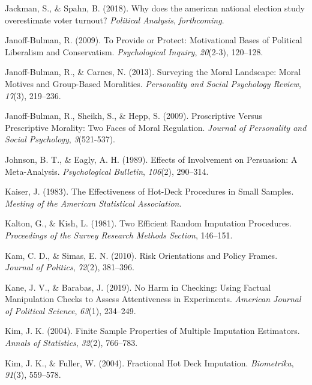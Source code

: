 \documentclass[12pt,econ]{sources/authesis}
\begin{document}
\leavevmode\hypertarget{ref-jackman_2018_does}{}%
Jackman, S., \& Spahn, B. (2018). Why does the american national election study overestimate voter turnout? \emph{Political Analysis}, \emph{forthcoming}.

\leavevmode\hypertarget{ref-janoff-bulman_2009_provide}{}%
Janoff-Bulman, R. (2009). To Provide or Protect: Motivational Bases of Political Liberalism and Conservatism. \emph{Psychological Inquiry}, \emph{20}(2-3), 120--128.

\leavevmode\hypertarget{ref-janoff-bulman_2013_surveying}{}%
Janoff-Bulman, R., \& Carnes, N. (2013). Surveying the Moral Landscape: Moral Motives and Group-Based Moralities. \emph{Personality and Social Psychology Review}, \emph{17}(3), 219--236.

\leavevmode\hypertarget{ref-janoff-bulman_2009_proscriptive}{}%
Janoff-Bulman, R., Sheikh, S., \& Hepp, S. (2009). Proscriptive Versus Prescriptive Morality: Two Faces of Moral Regulation. \emph{Journal of Personality and Social Psychology}, \emph{3}(521-537).

\leavevmode\hypertarget{ref-johnson_1989_effects}{}%
Johnson, B. T., \& Eagly, A. H. (1989). Effects of Involvement on Persuasion: A Meta-Analysis. \emph{Psychological Bulletin}, \emph{106}(2), 290--314.

\leavevmode\hypertarget{ref-kaiser_1983_effectiveness}{}%
Kaiser, J. (1983). The Effectiveness of Hot-Deck Procedures in Small Samples. \emph{Meeting of the American Statistical Association}.

\leavevmode\hypertarget{ref-kalton_1981_efficient}{}%
Kalton, G., \& Kish, L. (1981). Two Efficient Random Imputation Procedures. \emph{Proceedings of the Survey Research Methods Section}, 146--151.

\leavevmode\hypertarget{ref-kam_risk_2010}{}%
Kam, C. D., \& Simas, E. N. (2010). Risk Orientations and Policy Frames. \emph{Journal of Politics}, \emph{72}(2), 381--396.

\leavevmode\hypertarget{ref-kane_2019_harm}{}%
Kane, J. V., \& Barabas, J. (2019). No Harm in Checking: Using Factual Manipulation Checks to Assess Attentiveness in Experiments. \emph{American Journal of Political Science}, \emph{63}(1), 234--249.

\leavevmode\hypertarget{ref-kim_2004_finite}{}%
Kim, J. K. (2004). Finite Sample Properties of Multiple Imputation Estimators. \emph{Annals of Statistics}, \emph{32}(2), 766--783.

\leavevmode\hypertarget{ref-kim_2004_fractional}{}%
Kim, J. K., \& Fuller, W. (2004). Fractional Hot Deck Imputation. \emph{Biometrika}, \emph{91}(3), 559--578.
\end{document}
